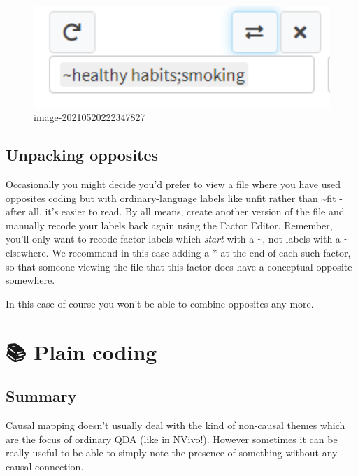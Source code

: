 \documentclass[
]{book}
\begin{document}
\begin{figure}
\centering
\includegraphics[width=6.77083in,height=\textheight]{_assets/image-20210520222347827.png}
\caption{image-20210520222347827}
\end{figure}

\hypertarget{unpacking-opposites}{%
\section{Unpacking opposites}\label{unpacking-opposites}}

Occasionally you might decide you'd prefer to view a file where you have used opposites coding but with ordinary-language labels like unfit rather than \textasciitilde fit - after all, it's easier to read. By all means, create another version of the file and manually recode your labels back again using the Factor Editor. Remember, you'll only want to recode factor labels which \emph{start} with a \texttt{\textasciitilde{}}, not labels with a \texttt{\textasciitilde{}} elsewhere. We recommend in this case adding a * at the end of each such factor, so that someone viewing the file that this factor does have a conceptual opposite somewhere.

In this case of course you won't be able to combine opposites any more.

\hypertarget{xplain_coding}{%
\chapter{📚 Plain coding}\label{xplain_coding}}

\hypertarget{summary-5}{%
\section{Summary}\label{summary-5}}

Causal mapping doesn't usually deal with the kind of non-causal themes which are the focus of ordinary QDA (like in NVivo!). However sometimes it can be really useful to be able to simply note the presence of something without any causal connection.
\end{document}
